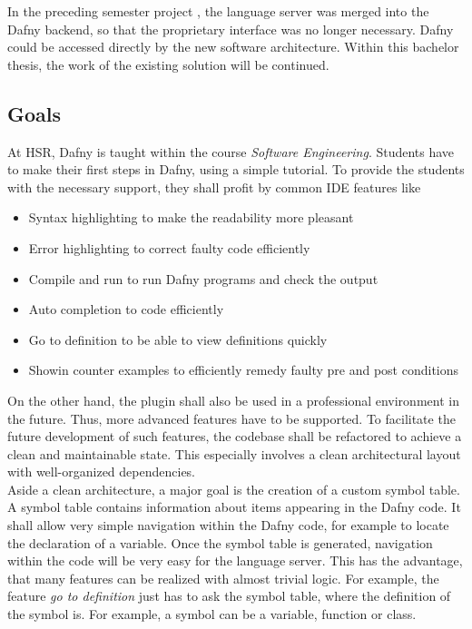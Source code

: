 In the preceding semester project \cite{sa}, the language server was merged into the Dafny backend, so that the proprietary interface was no longer necessary.
Dafny could be accessed directly by the new software architecture.
Within this bachelor thesis, the work of the existing solution will be continued.


\subsection{Goals}
At HSR, Dafny is taught within the course \textit{Software Engineering}.
Students have to make their first steps in Dafny, using a simple tutorial.
To provide the students with the necessary support, they shall profit by common IDE features like
\begin{itemize}
    \item Syntax highlighting to make the readability more pleasant
    \item Error highlighting to correct faulty code efficiently
    \item Compile and run to run Dafny programs and check the output
    \item Auto completion to code efficiently
    \item Go to definition to be able to view definitions quickly
    \item Showin counter examples to efficiently remedy faulty pre and post conditions
\end{itemize}

On the other hand, the plugin shall also be used in a professional environment in the future.
Thus, more advanced features have to be supported.
To facilitate the future development of such features, the codebase shall be refactored to achieve a clean and maintainable state.
This especially involves a clean architectural layout with well-organized dependencies.\\

Aside a clean architecture, a major goal is the creation of a custom symbol table.
A symbol table contains information about items appearing in the Dafny code.
It shall allow very simple navigation within the Dafny code, for example to locate the declaration of a variable.
Once the symbol table is generated, navigation within the code will be very easy for the language server.
This has the advantage, that many features can be realized with almost trivial logic.
For example, the feature \textit{go to definition} just has to ask the symbol table, where the definition of the symbol is.
For example, a symbol can be a variable, function or class.

